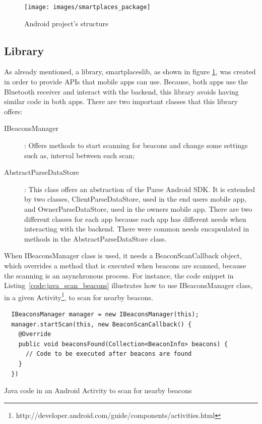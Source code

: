 \begin{figure}[!ht]
  \centering
    \texttt{[image: images/smartplaces\_package]}
    \caption{Android project's structure}
    \label{fig:smartplaces_package}
\end{figure}

\subsection{Library}
\label{sub:implementation_library}
As already mentioned, a library, smartplaceslib, as shown in figure \ref{fig:smartplaces_package}, was created in order to provide \glspl{API} that mobile apps can
use. Because, both apps use the Bluetooth receiver and interact with the backend, this library avoids having similar code in both apps. There are two important classes that this library offers:
\begin{description}
  \item[IBeaconsManager]: Offers methods to start scanning for beacons and change some settings such as, interval between each scan;
  \item[AbstractParseDataStore]: This class offers an abstraction of the Parse Android \gls{SDK}. It is extended by two classes, ClientParseDataStore, used in the end users mobile app, and OwnerParseDataStore, used in the owners mobile app. There are two different classes for each app because each app has different needs when interacting with the backend. There were common needs encapsulated in methods in the AbstractParseDataStore class.
\end{description}

When IBeaconsManager class is used, it needs a BeaconScanCallback object, which overrides a method that is executed when beacons are scanned, because the scanning is an asynchronous process.
For instance, the code snippet in Listing~\ref{code:java_scan_beacons} illustrates how to use IBeaconsManager class, in a given
Activity\footnote{http://developer.android.com/guide/components/activities.html}, to scan for nearby beacons.

\begin{listing}[H]
  \begin{verbatim}
  IBeaconsManager manager = new IBeaconsManager(this);
  manager.startScan(this, new BeaconScanCallback() {
    @Override
    public void beaconsFound(Collection<BeaconInfo> beacons) {
      // Code to be executed after beacons are found
    }
  })
  \end{verbatim}
  \caption{Java code in an Android Activity to scan for nearby beacons}
  \label{code:java_scan_beacons}
\end{listing}

